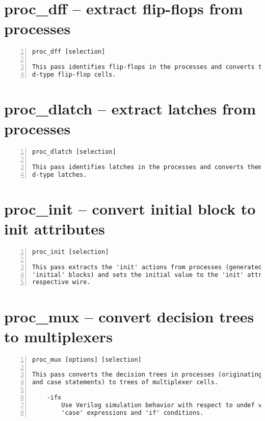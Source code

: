 \section{proc\_dff -- extract flip-flops from processes}
\label{cmd:proc_dff}
\begin{lstlisting}[numbers=left,frame=single]
    proc_dff [selection]

This pass identifies flip-flops in the processes and converts them to
d-type flip-flop cells.
\end{lstlisting}

\section{proc\_dlatch -- extract latches from processes}
\label{cmd:proc_dlatch}
\begin{lstlisting}[numbers=left,frame=single]
    proc_dlatch [selection]

This pass identifies latches in the processes and converts them to
d-type latches.
\end{lstlisting}

\section{proc\_init -- convert initial block to init attributes}
\label{cmd:proc_init}
\begin{lstlisting}[numbers=left,frame=single]
    proc_init [selection]

This pass extracts the 'init' actions from processes (generated from Verilog
'initial' blocks) and sets the initial value to the 'init' attribute on the
respective wire.
\end{lstlisting}

\section{proc\_mux -- convert decision trees to multiplexers}
\label{cmd:proc_mux}
\begin{lstlisting}[numbers=left,frame=single]
    proc_mux [options] [selection]

This pass converts the decision trees in processes (originating from if-else
and case statements) to trees of multiplexer cells.

    -ifx
        Use Verilog simulation behavior with respect to undef values in
        'case' expressions and 'if' conditions.
\end{lstlisting}

